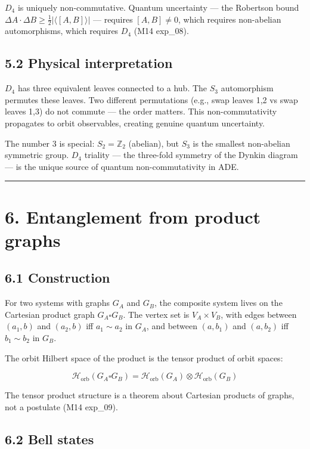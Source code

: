 \documentclass[11pt,a4paper]{article}
\begin{document}
$D_4$ is uniquely non-commutative. Quantum uncertainty — the Robertson bound $\Delta A \cdot \Delta B \geq \frac{1}{2}|\langle [A, B] \rangle|$ — requires $[A, B] \neq 0$, which requires non-abelian automorphisms, which requires $D_4$ (M14 exp\_08).

\subsection*{5.2 Physical interpretation}

$D_4$ has three equivalent leaves connected to a hub. The $S_3$ automorphism permutes these leaves. Two different permutations (e.g., swap leaves 1,2 vs swap leaves 1,3) do not commute — the order matters. This non-commutativity propagates to orbit observables, creating genuine quantum uncertainty.

The number 3 is special: $S_2 = \mathbb{Z}_2$ (abelian), but $S_3$ is the smallest non-abelian symmetric group. $D_4$ triality — the three-fold symmetry of the Dynkin diagram — is the unique source of quantum non-commutativity in ADE.

\begin{center}\rule{0.5\linewidth}{0.4pt}\end{center}

\section*{6. Entanglement from product graphs}

\subsection*{6.1 Construction}

For two systems with graphs $G_A$ and $G_B$, the composite system lives on the Cartesian product graph $G_A \square G_B$. The vertex set is $V_A \times V_B$, with edges between $(a_1, b)$ and $(a_2, b)$ iff $a_1 \sim a_2$ in $G_A$, and between $(a, b_1)$ and $(a, b_2)$ iff $b_1 \sim b_2$ in $G_B$.

The orbit Hilbert space of the product is the tensor product of orbit spaces:

\[\mathcal{H}_{\text{orb}}(G_A \square G_B) = \mathcal{H}_{\text{orb}}(G_A) \otimes \mathcal{H}_{\text{orb}}(G_B)\]

The tensor product structure is a theorem about Cartesian products of graphs, not a postulate (M14 exp\_09).

\subsection*{6.2 Bell states}
\end{document}
